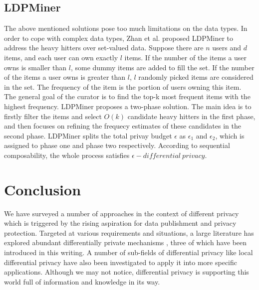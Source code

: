 \documentclass[a4paper, 11pt]{article} %
\begin{document}
\subsection{LDPMiner}
The above mentioned solutions pose too much limitations on the data types. In order to cope with complex data types, Zhan et al. proposed LDPMiner\cite{qin2016heavy} to address the heavy hitters over set-valued data. Suppose there are $n$ users and $d$ items, and each user can own exactly $l$ items. If the number of the items a user owns is smaller than $l$, some dummy items are added to fill the set. If the number of the items a user owns is greater than $l$, $l$ randomly picked items are considered in the set. The frequency of the item is the portion of users owning this item. The general goal of the curator is to find the top-k most frequent items with the highest frequency. LDPMiner proposes a two-phase solution. The main idea is to firstly filter the items and select $O(k)$ candidate heavy hitters in the first phase, and then focuses on refining the frequecy estimates of these candidates in the second phase. LDPMiner splits the total privay budget $\epsilon$ as $\epsilon_1$ and $\epsilon_2$, which is assigned to phase one and phase two respectively. According to sequential composability\cite{mcsherry2009privacy}, the whole process satisfies $\epsilon - differential \ privacy$.

\section*{Conclusion}
We have surveyed a number of approaches in the context of different privacy which is triggered by the rising aspiration for data publishment and privacy protection. Targeted at various requirements and situations, a large literature has explored abundant differentially private mechanisms \cite{mcsherry2007mechanism}, three of which have been introduced in this writing. A number of sub-fields of differential privacy like local differential privacy have also been investigated to apply it into more specific applications. Although we may not notice, differential privacy is supporting this world full of information and knowledge in its way.









\end{document}
